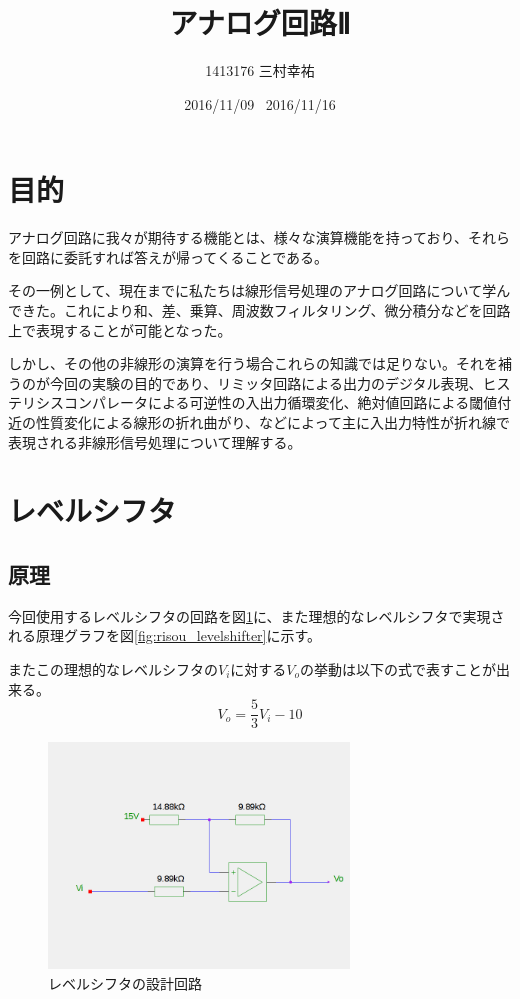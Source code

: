 \documentclass[11pt,a4j]{jsarticle}
\title{アナログ回路Ⅱ}
\author{1413176 三村幸祐}
\date{2016/11/09 \, 2016/11/16}
\begin{document}
  
 \tableofcontents \newpage
  
 \section{目的}
 アナログ回路に我々が期待する機能とは、様々な演算機能を持っており、それらを回路に委託すれば答えが帰ってくることである。
 
  その一例として、現在までに私たちは線形信号処理のアナログ回路について学んできた。これにより和、差、乗算、周波数フィルタリング、微分積分などを回路上で表現することが可能となった。
  
  しかし、その他の非線形の演算を行う場合これらの知識では足りない。それを補うのが今回の実験の目的であり、リミッタ回路による出力のデジタル表現、ヒステリシスコンパレータによる可逆性の入出力循環変化、絶対値回路による閾値付近の性質変化による線形の折れ曲がり、などによって主に入出力特性が折れ線で表現される非線形信号処理について理解する。
  
 \section{レベルシフタ}
  \subsection{原理}
   
   今回使用するレベルシフタの回路を図\ref{fig:levelshifter}に、また理想的なレベルシフタで実現される原理グラフを図\ref{fig:risou_levelshifter}に示す。
   
   またこの理想的なレベルシフタの$V_i$に対する$V_o$の挙動は以下の式で表すことが出来る。
   \begin{equation}
   V_o = \frac{5}{3} V_i - 10
   \end{equation}
   
   \begin{figure}[htbp]
  \centering
  \includegraphics[width=8cm,clip]{levelshifter.png}
  \caption{レベルシフタの設計回路}
  \label{fig:levelshifter}
 \end{figure}%
   
\end{document}
